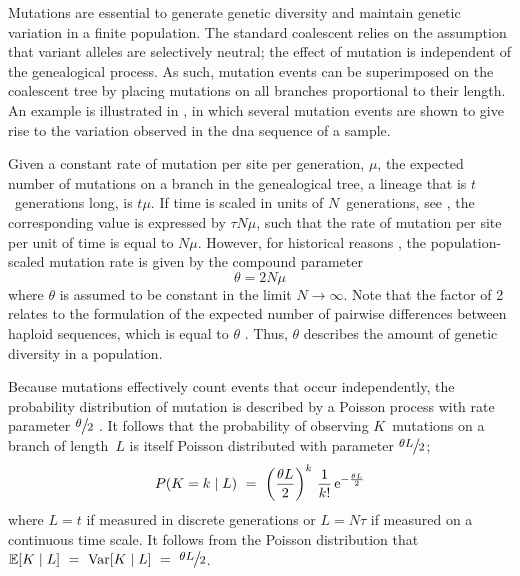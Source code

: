 Mutations are essential to generate genetic diversity and maintain genetic variation in a finite population.
The standard coalescent relies on the assumption that variant alleles are selectively neutral; \ie the effect of mutation is independent of the genealogical process.
As such, mutation events can be superimposed on the coalescent tree by placing mutations on all branches proportional to their length.
An example is illustrated in , in which several mutation events are shown to give rise to the variation observed in the \gls{dna} sequence of a sample.

%

%

Given a constant rate of mutation per site per generation, $\mu$, the expected number of mutations on a branch in the genealogical tree, \ie a lineage that is $t$~generations long, is ${t\mu}$.
If time is scaled in units of $N$~generations, see , the corresponding value is expressed by ${\tau N \mu}$, such that the rate of mutation per site per unit of time is equal to ${N \mu}$.
However, for historical reasons \citep[\eg, see][]{wakeley2008}, the population-scaled mutation rate is given by the compound parameter
\begin{equation}\label{eq:mutrate}
	\theta = 2 N \mu
\end{equation}
where $\theta$ is assumed to be constant in the limit ${N\rightarrow\infty}$.
Note that the factor of 2 relates to the formulation of the expected number of pairwise differences between  haploid sequences, which is equal to $\theta$ \citep{tajima1993}.
Thus, $\theta$ describes the amount of genetic diversity in a population.

Because mutations effectively count events that occur independently, the probability distribution of mutation is described by a Poisson process with rate parameter ${\large \sfrac{\theta}{2}}$ \citep{wakeley2008}.
It follows that the probability of observing $K$~mutations on a branch of length~$L$ is itself Poisson distributed with parameter ${\large \sfrac{\theta L}{2}}$;
\begin{equation}
	P(K = k \mid L) ~=~ \bigg( \frac{\theta L}{2} \bigg)^k ~ \frac{1}{k!} \,\mathrm{e}^{-\frac{\theta L}{2}}
\end{equation}
where ${L=t}$ if measured in discrete generations or ${L=N\tau}$ if measured on a continuous time scale.
It follows from the Poisson distribution that ${\mathbb{E}[K \mid L] ~=~ \operatorname{Var}[K \mid L] ~=~ \large \sfrac{\theta L}{2}}$.

